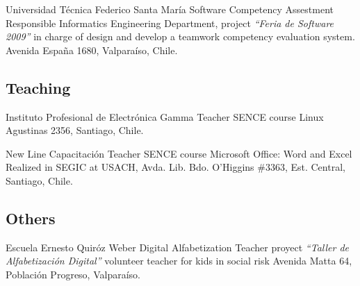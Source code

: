 	
	{Universidad T\'ecnica Federico Santa Mar\'ia}
	{Software Competency Assestment Responsible}
	{Informatics Engineering Department, project \textit{``Feria de Software 2009''}}
	{in charge of design and develop a teamwork competency evaluation system.}
	{Avenida Espa\~na 1680,  Valpara\'iso, Chile.}
	

\subsection{Teaching}
	
	{Instituto Profesional de Electrónica Gamma} %
	{Teacher} %
	{SENCE course} %
	{Linux}
    {Agustinas 2356, Santiago, Chile.}
	
	{New Line Capacitación} %
	{Teacher} %
	{SENCE course} %
	{Microsoft Office: Word and Excel}
	{Realized in SEGIC at USACH, Avda. Lib. Bdo. O'Higgins \#3363, Est.
    Central, Santiago, Chile.}
	

	

	
	
\subsection{Others}
%	
%

	{Escuela Ernesto Quir\'oz Weber}
	{Digital Alfabetization Teacher}
	{proyect \textit{``Taller de Alfabetizaci\'on Digital''}}
	{volunteer teacher for kids in social risk}
	{Avenida Matta 64, Poblaci\'on Progreso, Valpara\'iso.}
 

